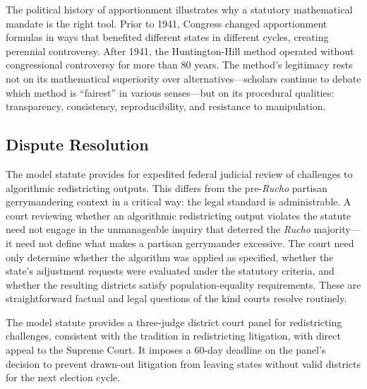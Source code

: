 The political history of apportionment illustrates why a statutory mathematical mandate is the right tool. Prior to 1941, Congress changed apportionment formulas in ways that benefited different states in different cycles, creating perennial controversy. After 1941, the Huntington-Hill method operated without congressional controversy for more than 80 years. The method's legitimacy rests not on its mathematical superiority over alternatives---scholars continue to debate which method is ``fairest'' in various senses---but on its procedural qualities: transparency, consistency, reproducibility, and resistance to manipulation.

\subsection{Dispute Resolution}

The model statute provides for expedited federal judicial review of challenges to algorithmic redistricting outputs. This differs from the pre-\textit{Rucho} partisan gerrymandering context in a critical way: the legal standard is administrable. A court reviewing whether an algorithmic redistricting output violates the statute need not engage in the unmanageable inquiry that deterred the \textit{Rucho} majority---it need not define what makes a partisan gerrymander excessive. The court need only determine whether the algorithm was applied as specified, whether the state's adjustment requests were evaluated under the statutory criteria, and whether the resulting districts satisfy population-equality requirements. These are straightforward factual and legal questions of the kind courts resolve routinely.

The model statute provides a three-judge district court panel for redistricting challenges, consistent with the tradition in redistricting litigation, with direct appeal to the Supreme Court. It imposes a 60-day deadline on the panel's decision to prevent drawn-out litigation from leaving states without valid districts for the next election cycle.
